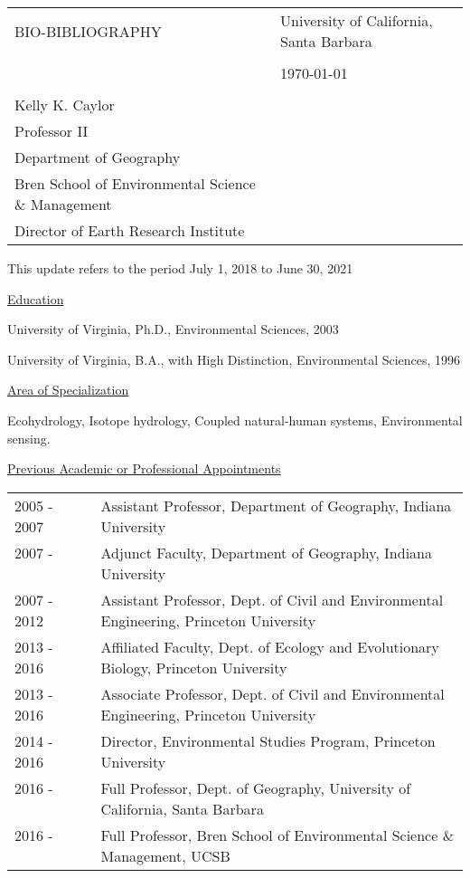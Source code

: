 \documentclass[10pt]{article}
\begin{document}
\noindent
\begin{tabularx}{\linewidth}{XX} 
BIO-BIBLIOGRAPHY & \hfill University of California, Santa Barbara \\ \\
 & \hfill \today \\ \\
 Kelly K. Caylor &   \\ 
 Professor II & \\
 Department of Geography & \\
 Bren School of Environmental Science \& Management & \\
 Director of Earth Research Institute & 
 \end{tabularx}

\vspace{1cm}

This update refers to the period July 1, 2018 to June 30, 2021


\vspace{1cm}

\raggedright

\vspace{0.5cm}
\underline{Education}

University of Virginia, Ph.D., Environmental Sciences, 2003

University of Virginia, B.A., with High Distinction, Environmental Sciences, 1996

\vspace{0.5cm}
\underline{Area of Specialization}

Ecohydrology, Isotope hydrology, Coupled natural-human systems, Environmental sensing.

\vspace{0.5cm}
\underline{Previous Academic or Professional Appointments}
\begin{tabular}{l p{5.5in} }

2005 - 2007 \ \ \ \  & Assistant Professor, Department of Geography, Indiana University \\
2007 - \ \ \ \ & Adjunct Faculty, Department of Geography, Indiana University \\ 
2007 - 2012 \ \ \ \ & Assistant Professor, Dept. of Civil and Environmental Engineering, Princeton University \\
2013 - 2016 & Affiliated Faculty, Dept. of Ecology and Evolutionary Biology, Princeton University \\
2013 - 2016 & Associate Professor, Dept. of Civil and Environmental Engineering, Princeton University \\
2014 - 2016 & Director, Environmental Studies Program, Princeton University \\
2016 - \ \ \ \ & Full Professor, Dept. of Geography, University of California, Santa Barbara \\ 
2016 - \ \ \ \ & Full Professor, Bren School of Environmental Science \& Management, UCSB \\ 

\end{tabular}
\end{document}
